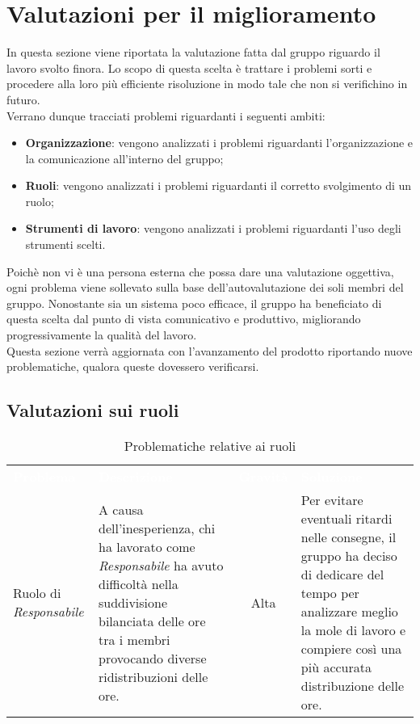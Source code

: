 \section{Valutazioni per il miglioramento}
In questa sezione viene riportata la valutazione fatta dal gruppo riguardo il lavoro svolto finora.
Lo scopo di questa scelta è trattare i problemi sorti e procedere alla loro più efficiente risoluzione
in modo tale che non si verifichino in futuro. \\
Verrano dunque tracciati problemi riguardanti i seguenti ambiti: \begin{itemize}
\item \textbf{Organizzazione}: vengono analizzati i problemi riguardanti l'organizzazione e la comunicazione all'interno del gruppo;
\item \textbf{Ruoli}: vengono analizzati i problemi riguardanti il corretto svolgimento di un ruolo;
\item \textbf{Strumenti di lavoro}: vengono analizzati i problemi riguardanti l'uso degli strumenti scelti.
\end{itemize}
Poichè non vi è una persona esterna che possa dare una valutazione oggettiva, ogni problema viene sollevato sulla base dell'autovalutazione dei soli membri del gruppo. Nonostante sia un sistema poco efficace, il gruppo ha beneficiato di questa scelta dal punto di vista comunicativo e produttivo, migliorando progressivamente la qualità del lavoro.\\
Questa sezione verrà aggiornata con l'avanzamento del prodotto riportando nuove problematiche, qualora queste dovessero verificarsi.

\subsection{Valutazioni sui ruoli}

\begin{table}[H]
\caption{Problematiche relative ai ruoli}
\begin{center}
\begin{tabular}{ C{2.5cm} L{5cm} c L{5.5cm} }
\textcolor{white}{\textbf{Problema}} & \centerline{\textcolor{white}{\textbf{Descrizione}}} & \textcolor{white}{\textbf{Gravità}} & \centerline{\textcolor{white}{\textbf{Soluzione}}}\\
Ruolo di \textit{Responsabile} & A causa dell'inesperienza, chi ha lavorato come \textit{Responsabile} ha avuto difficoltà nella suddivisione bilanciata delle ore tra i membri provocando diverse ridistribuzioni delle ore. & Alta & Per evitare eventuali ritardi nelle consegne, il gruppo ha deciso di dedicare del tempo per analizzare meglio la mole di lavoro e compiere così una più accurata distribuzione delle ore. \\
\end{tabular}
\end{center}
\end{table}
\pagebreak
